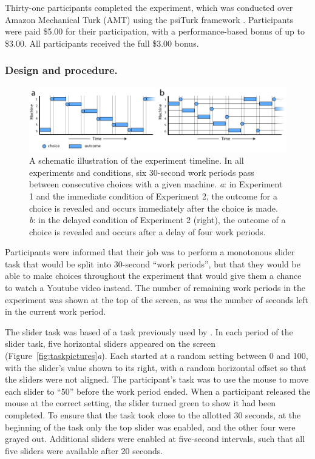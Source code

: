 \documentclass[10pt,letterpaper]{article}
\begin{document}
Thirty-one participants completed the experiment, which was conducted over
Amazon Mechanical Turk (AMT) using the psiTurk framework \citep{Gureckis2015a}.
Participants were paid \$5.00 for their participation, with a performance-based
bonus of up to \$3.00. All participants received the full \$3.00 bonus.

\subsubsection{Design and procedure.}


\begin{figure}
\centering
\includegraphics[width=\textwidth]{figures/machinetimeline.png}
\caption{A schematic illustration of the experiment timeline. In all experiments
  and conditions, six 30-second work periods pass between consecutive choices
  with a given machine. \emph{a}: in Experiment 1 and the immediate condition of
  Experiment 2, the outcome for a choice is revealed and occurs immediately
  after the choice is made. \emph{b}: in the delayed condition of Experiment 2 (right),
  the outcome of a choice is revealed and occurs after a delay of four work
  periods.}
\label{fig:machinetimeline}
\end{figure}



Participants were informed that their job was to perform a monotonous slider task that
would be split into 30-second ``work periods'', but that they would be able to
make choices throughout the experiment that would give them a chance to watch a
Youtube video instead. The number of remaining work periods in the experiment was shown
at the top of the screen, as was the number of seconds left in the current work period.

The slider task was based of a task previously used by \citet{Gill2012}. In each
period of the slider task, five horizontal sliders appeared on the screen (Figure~\ref{fig:taskpictures}\emph{a}). Each
started at a random setting between 0 and 100, with the slider's value
shown to its right, with a random horizontal offset so that the
sliders were not aligned. The participant's task was to use the mouse to move
each slider to ``50'' before the work period ended. When a participant released
the mouse at the correct setting, the slider turned green to show it had been
completed. To ensure that the task took close to the allotted 30 seconds, at the
beginning of the task only the top slider was enabled, and the other four were
grayed out. Additional sliders were enabled at five-second intervals, such that
all five sliders were available after 20 seconds.
\end{document}
